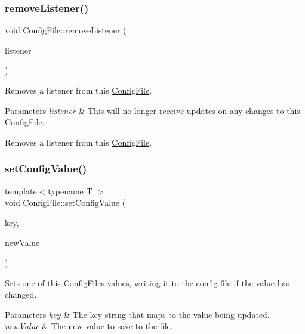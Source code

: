 \subsubsection{\texorpdfstring{remove\+Listener()}{removeListener()}}
{\footnotesize\ttfamily void Config\+File\+::remove\+Listener (\begin{DoxyParamCaption}\item[{\mbox{\hyperlink{classConfigFile_1_1Listener}{Config\+File\+::\+Listener}} $\ast$}]{listener }\end{DoxyParamCaption})}

Removes a listener from this \mbox{\hyperlink{classConfigFile}{Config\+File}}.


\begin{DoxyParams}{Parameters}
{\em listener} & This will no longer receive updates on any changes to this \mbox{\hyperlink{classConfigFile}{Config\+File}}.\\
\hline
\end{DoxyParams}
Removes a listener from this \mbox{\hyperlink{classConfigFile}{Config\+File}}. \mbox{\label{classConfigFile_ae5fb973a2863f027b21fb17ebfdcd45c}} 
\subsubsection{\texorpdfstring{set\+Config\+Value()}{setConfigValue()}}
{\footnotesize\ttfamily template$<$typename T $>$ \\
void Config\+File\+::set\+Config\+Value (\begin{DoxyParamCaption}\item[{String}]{key,  }\item[{T}]{new\+Value }\end{DoxyParamCaption})\hspace{0.3cm}{\ttfamily [inline]}}

Sets one of this \mbox{\hyperlink{classConfigFile}{Config\+File}}\textquotesingle{}s values, writing it to the config file if the value has changed. ~\newline
 
\begin{DoxyParams}{Parameters}
{\em key} & The key string that maps to the value being updated.\\
\hline
{\em new\+Value} & The new value to save to the file.\\
\hline
\end{DoxyParams}

